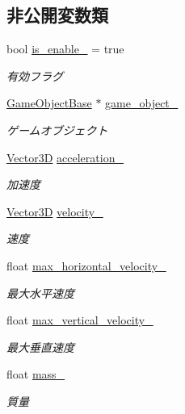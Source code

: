 \subsection*{非公開変数類}
\begin{DoxyCompactItemize}
\item 
bool \mbox{\hyperlink{class_physics_aa1ce0627c339b93ca16d3db4ccbdbd18}{is\+\_\+enable\+\_\+}} = true
\begin{DoxyCompactList}\small\item\em 有効フラグ \end{DoxyCompactList}\item 
\mbox{\hyperlink{class_game_object_base}{Game\+Object\+Base}} $\ast$ \mbox{\hyperlink{class_physics_a43e626ecc90d765a7cbd4c561b19331a}{game\+\_\+object\+\_\+}}
\begin{DoxyCompactList}\small\item\em ゲームオブジェクト \end{DoxyCompactList}\item 
\mbox{\hyperlink{class_vector3_d}{Vector3D}} \mbox{\hyperlink{class_physics_a8e87f3c364d5d0b8d3fb228237f3ff56}{acceleration\+\_\+}}
\begin{DoxyCompactList}\small\item\em 加速度 \end{DoxyCompactList}\item 
\mbox{\hyperlink{class_vector3_d}{Vector3D}} \mbox{\hyperlink{class_physics_a9818c603a813d8f70254812f43e67b3e}{velocity\+\_\+}}
\begin{DoxyCompactList}\small\item\em 速度 \end{DoxyCompactList}\item 
float \mbox{\hyperlink{class_physics_a0ed07971c58b56acb606ece7caa03068}{max\+\_\+horizontal\+\_\+velocity\+\_\+}}
\begin{DoxyCompactList}\small\item\em 最大水平速度 \end{DoxyCompactList}\item 
float \mbox{\hyperlink{class_physics_a5018fa4a3e2e72533e669112e6aebbc4}{max\+\_\+vertical\+\_\+velocity\+\_\+}}
\begin{DoxyCompactList}\small\item\em 最大垂直速度 \end{DoxyCompactList}\item 
float \mbox{\hyperlink{class_physics_a68f81110a54f8ed24ac94b6cd33c3ae0}{mass\+\_\+}}
\begin{DoxyCompactList}\small\item\em 質量 \end{DoxyCompactList}\item 

\end{DoxyCompactItemize}
